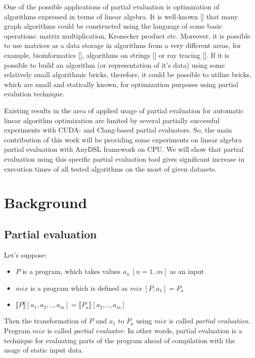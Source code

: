 \documentclass[conference]{IEEEtran}
\begin{document}
One of the possible applications of partial evaluation is optimization of algorithms expressed in terms of linear algebra. It is well-known [] that many graph algorithms could be constructed using the language of some basic operations: matrix multiplication, Kronecker product etc. Moreover, it is possible to use matrices as a data storage in algorithms from a very different areas, for example, bioinformatics [], algorithms on strings [] or ray tracing []. If it is possible to build an algorithm (or representation of it's data) using some relatively small algorithmic bricks, therefore, it could be possible to utilize bricks, which are small and statically known, for optimization purposes using partial evalution technique.

Existing results in the area of applied usage of partial evaluation for automatic linear algorithm optimization are limited by several partially successful experiments with CUDA- and Clang-based partial evaluators. So, the main contribution of this work  will be providing some experiments on linear algebra partial evaluation with AnyDSL framework on CPU. We will show that partial evaluation using this specific partial evaluation tool gives significant increase in execution times of all tested algorithms on the most of given datasets.


\section{Background}

\subsection{Partial evaluation}

Let's suppose:

\begin{itemize}
	\item $P$ is a program, which takes values $a_n\ [n=1..m]$ as an input
	\item $mix$ is a program which is defined as $mix\ [P, a_1] = P_a$
	\item $\llbracket P \rrbracket [a_1, a_2, .., a_m] = \llbracket P_a \rrbracket [a_2, .., a_m]$
\end{itemize}
Then the transformation of $P$ and $a_1$ to $P_a$ using $mix$ is called \textit{partial evaluation}. Program $mix$ is called \textit{partial evaluator}. In other words, partial evaluation is a technique for evaluating parts of the program ahead of compilation with the usage of static input data.
\end{document}
